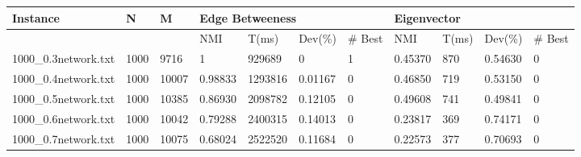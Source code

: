 \begin{sidewaystable} %
	\label{table:results2}
	\begin{tabular}{lllllllllll}
		\hline
		\multicolumn{1}{|l|}{Instance}             & \multicolumn{1}{l|}{N}    & \multicolumn{1}{l|}{M}     & \multicolumn{4}{l|}{Edge Betweeness}                                                                                      & \multicolumn{4}{l|}{Eigenvector}                                                                                        \\ \hline
		\multicolumn{1}{|l|}{}                     & \multicolumn{1}{l|}{}     & \multicolumn{1}{l|}{}      & \multicolumn{1}{l|}{NMI}     & \multicolumn{1}{l|}{T(ms)}   & \multicolumn{1}{l|}{Dev(\%)} & \multicolumn{1}{l|}{\# Best} & \multicolumn{1}{l|}{NMI}     & \multicolumn{1}{l|}{T(ms)} & \multicolumn{1}{l|}{Dev(\%)} & \multicolumn{1}{l|}{\# Best} \\ \hline
		\multicolumn{1}{|l|}{1000\_0.3network.txt} & \multicolumn{1}{l|}{1000} & \multicolumn{1}{l|}{9716}  & \multicolumn{1}{l|}{1}       & \multicolumn{1}{l|}{929689}  & \multicolumn{1}{l|}{0}       & \multicolumn{1}{l|}{1}       & \multicolumn{1}{l|}{0.45370} & \multicolumn{1}{l|}{870}   & \multicolumn{1}{l|}{0.54630} & \multicolumn{1}{l|}{0}       \\ \hline
		\multicolumn{1}{|l|}{1000\_0.4network.txt} & \multicolumn{1}{l|}{1000} & \multicolumn{1}{l|}{10007} & \multicolumn{1}{l|}{0.98833} & \multicolumn{1}{l|}{1293816} & \multicolumn{1}{l|}{0.01167} & \multicolumn{1}{l|}{0}       & \multicolumn{1}{l|}{0.46850} & \multicolumn{1}{l|}{719}   & \multicolumn{1}{l|}{0.53150} & \multicolumn{1}{l|}{0}       \\ \hline
		\multicolumn{1}{|l|}{1000\_0.5network.txt} & \multicolumn{1}{l|}{1000} & \multicolumn{1}{l|}{10385} & \multicolumn{1}{l|}{0.86930} & \multicolumn{1}{l|}{2098782} & \multicolumn{1}{l|}{0.12105} & \multicolumn{1}{l|}{0}       & \multicolumn{1}{l|}{0.49608} & \multicolumn{1}{l|}{741}   & \multicolumn{1}{l|}{0.49841} & \multicolumn{1}{l|}{0}       \\ \hline
		\multicolumn{1}{|l|}{1000\_0.6network.txt} & \multicolumn{1}{l|}{1000} & \multicolumn{1}{l|}{10042} & \multicolumn{1}{l|}{0.79288} & \multicolumn{1}{l|}{2400315} & \multicolumn{1}{l|}{0.14013} & \multicolumn{1}{l|}{0}       & \multicolumn{1}{l|}{0.23817} & \multicolumn{1}{l|}{369}   & \multicolumn{1}{l|}{0.74171} & \multicolumn{1}{l|}{0}       \\ \hline
		\multicolumn{1}{|l|}{1000\_0.7network.txt} & \multicolumn{1}{l|}{1000} & \multicolumn{1}{l|}{10075} & \multicolumn{1}{l|}{0.68024} & \multicolumn{1}{l|}{2522520} & \multicolumn{1}{l|}{0.11684} & \multicolumn{1}{l|}{0}       & \multicolumn{1}{l|}{0.22573} & \multicolumn{1}{l|}{377}   & \multicolumn{1}{l|}{0.70693} & \multicolumn{1}{l|}{0}       \\ \hline

\end{tabular}
\end{sidewaystable}
